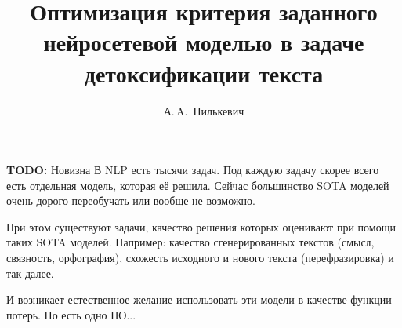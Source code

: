 \documentclass[12pt, fleqn, xcolor=x11names, xcolor=table, aspectratio=169]{beamer}
\title{Оптимизация критерия заданного нейросетевой моделью в задаче детоксификации текста}
\author[А.\,A.~Пилькевич]{А.\,A.~Пилькевич}
\institute{Московский физико-технический институт}
\date{\footnotesize
\par\smallskip\emph{Консультант:} А.\,С.~Попов
\par\bigskip\small 2022}
\begin{document}
\begin{frame}
\thispagestyle{empty}
\maketitle
\end{frame}

\begin{frame}{\textbf{TODO:} Новизна}
В NLP есть тысячи задач. 
Под каждую задачу скорее всего есть отдельная модель, которая её решила.  
Сейчас большинство SOTA моделей очень дорого переобучать или вообще не возможно.

При этом существуют задачи, качество решения которых оценивают при помощи таких SOTA моделей.
Например: 
качество сгенерированных текстов (смысл, связность, орфография), схожесть исходного и нового текста (перефразировка) и так далее. 

И возникает естественное желание использовать эти модели в качестве функции потерь. 
Но есть одно НО...

\end{frame}
\end{document}
